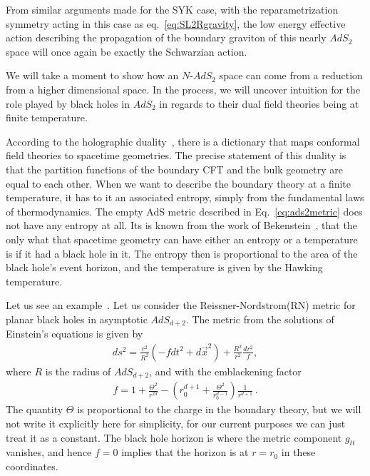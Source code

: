 \par
From similar arguments made for the SYK case, with the reparametrization symmetry acting in this case as eq.~\eqref{eq:SL2Rgravity}, the low energy effective action describing the propagation of the boundary graviton of this nearly $AdS_2$ space will once again be exactly the Schwarzian action. 
\par
We will take a moment to show how an $N$-$AdS_2$ space can come from a reduction from a higher dimensional space. In the process, we will uncover intuition for the role played by black holes in $AdS_2$ in regards to their dual field theories being at finite temperature.
\par
According to the holographic duality~\cite{maldacena1999large,gubser1998gauge,witten1998anti,zaanen2015holographic}, there is a dictionary that maps conformal field theories to spacetime geometries. The precise statement of this duality is that the partition functions of the boundary CFT and the bulk geometry are equal to each other. When we want to describe the  boundary theory at a finite temperature, it has to it an associated entropy, simply from the fundamental laws of thermodynamics. The empty AdS metric described in Eq.~\eqref{eq:ads2metric} does not have any entropy at all. Its is known from the work of Bekenstein~\cite{bekenstein1973black}, that the only what that spacetime geometry can have either an entropy or a temperature is if it had a black hole in it. The entropy then is proportional to the area of the black hole's event horizon, and the temperature is given by the Hawking temperature. 
\par 
Let us see an example~\cite{sachdev2015bekenstein,faulkner2011emergent,faulkner2011holographic}. Let us consider the Reissner-Nordstrom(RN) metric for planar black holes in asymptotic $AdS_{d+2}$. 
The metric from the solutions of Einstein's equations is given by
\begin{align}
    ds^2 = \frac{r^2}{R^2}\left(-f dt^2 + d\vec{x}^2\right) + \frac{R^2}{r^2}\frac{dr^2}{f}, 
    \label{eq:RNmetric}
\end{align}
where $R$ is the radius of $AdS_{d+2}$, and with the emblackening factor 
\begin{align}
    f = 1+\frac{\Theta^2}{r^{2d}} - \left(r_0^{d+1} + \frac{\Theta^2}{r_0^{d-1}}\right)\frac{1}{r^{d+1}}\,.
    \label{eq:RNemblackening}
\end{align}
The quantity $\Theta$ is proportional to the charge in the boundary theory, but we will not write it explicitly here for simplicity, for our current purposes we can just treat it as a constant. The black hole horizon is where the metric component $g_{tt}$ vanishes, and hence $f = 0$ implies that the horizon is at $r = r_0$ in these coordinates. 

